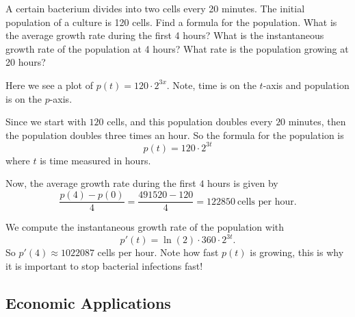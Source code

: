 \begin{example}
A certain bacterium divides into two cells every 20 minutes. The
initial population of a culture is 120 cells. Find a formula for the
population.  What is the average growth rate during the first 4 hours?
What is the instantaneous growth rate of the population at 4 hours?
What rate is the population growing at 20 hours?
\end{example}
\begin{marginfigure}
\caption{Here we see a plot of $p(t) = 120\cdot 2^{3x}$. Note, time is on
  the $t$-axis and population is on the $p$-axis.}
\end{marginfigure}


\begin{solution}
Since we start with $120$ cells, and this population doubles every $20$
minutes, then the population doubles three times an hour. So the
formula for the population is
\[
p(t) = 120\cdot 2^{3t}
\]
where $t$ is time measured in hours.

Now, the average growth rate during the first $4$ hours is given by
\[
\frac{p(4)-p(0)}{4} =\frac{491520-120}{4} = 122850~\text{cells per hour.}
\]

We compute the instantaneous growth rate of the population with
\[
p'(t) = \ln(2)\cdot 360\cdot 2^{3t}.
\]
So $p'(4) \approx 1022087$ cells per hour. Note how fast $p(t)$ is
growing, this is why it is important to stop bacterial infections
fast!
\end{solution}


\subsection*{Economic Applications}

